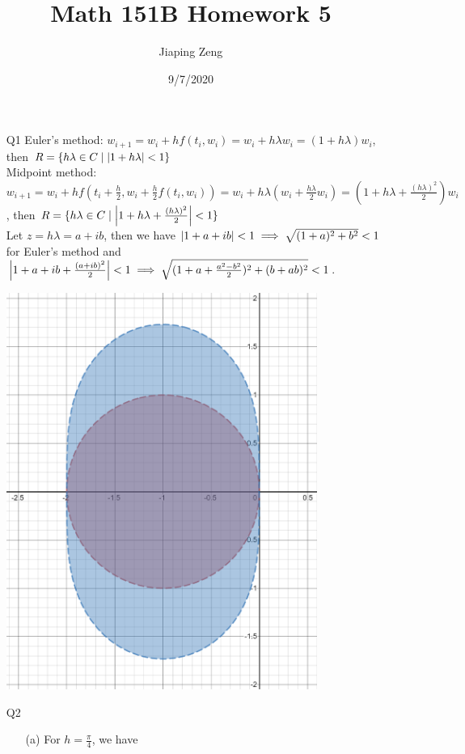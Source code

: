 \documentclass{article}
\title{Math 151B Homework 5}
\date{9/7/2020}
\author{Jiaping Zeng}
\begin{document}
\maketitle

\begin{itemize}
    \item [Q1] Euler's method: $w_{i+1}=w_i+hf(t_i,w_i)=w_i+h\lambda w_i=(1+h\lambda)w_i$, then $R=\{h\lambda\in C\mid\abs{1+h\lambda}<1\}$\\Midpoint method: $w_{i+1}=w_i+hf(t_i+\frac{h}{2},w_i+\frac{h}{2}f(t_i,w_i))=w_i+h\lambda(w_i+\frac{h\lambda}{2}w_i)=(1+h\lambda+\frac{(h\lambda)^2}{2})w_i$, then $R=\{h\lambda\in C\mid\abs{1+h\lambda+\frac{(h\lambda)^2}{2}}<1\}$\\Let $z=h\lambda=a+ib$, then we have $\abs{1+a+ib}<1\implies\sqrt{(1+a)^2+b^2}<1$ for Euler's method and $\abs{1+a+ib+\frac{(a+ib)^2}{2}}<1\implies\sqrt{(1+a+\frac{a^2-b^2}{2})^2+(b+ab)^2}<1$.
          \begin{center}
              \includegraphics[width=4in]{graph.png}
          \end{center}
    \item [Q2]
          \begin{itemize}
              \item [(a)] For $h=\frac{\pi}{4}$, we have\\
                    \begin{tabular}{|c|c|c|}

\end{tabular}
\end{itemize}
\end{itemize}
\end{document}
